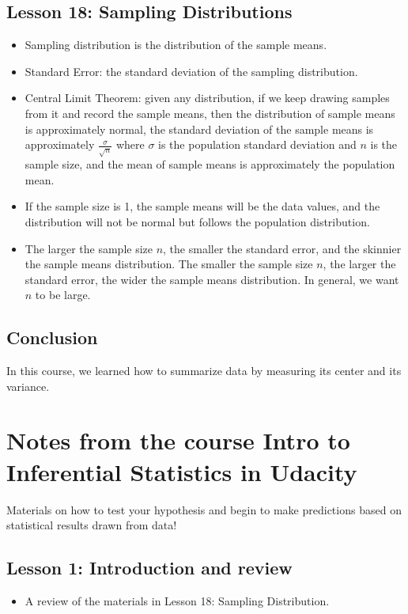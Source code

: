 \documentclass[twoside,12pt]{article}
\begin{document}
\subsection{Lesson 18: Sampling Distributions} 
\begin{itemize}
\item Sampling distribution is the distribution of the sample means. 
\item Standard Error: the standard deviation of the sampling distribution.
\item Central Limit Theorem: given any distribution, if we keep drawing samples from it and record the sample means, then the distribution of sample means is approximately normal, the standard deviation of the sample means is approximately $\frac{\sigma}{\sqrt{n}}$ where $\sigma$ is the population standard deviation and $n$ is the sample size, and the mean of sample means is approximately the population mean.
\item If the sample size is 1, the sample means will be the data values, and the distribution will not be normal but follows the population distribution.
\item The larger the sample size $n$, the smaller the standard error, and the skinnier the sample means distribution. The smaller the sample size $n$, the larger the standard error, the wider the sample means distribution. In general, we want $n$ to be large. 
\end{itemize}
\subsection{Conclusion}
In this course, we learned how to summarize data by measuring its center and its variance. 

\section{Notes from the course Intro to Inferential Statistics in Udacity}
Materials on how to test your hypothesis and begin to make predictions based on statistical results drawn from data!
\subsection{Lesson 1: Introduction and review}
\begin{itemize}
\item A review of the materials in Lesson 18: Sampling Distribution. 
\end{itemize}
\end{document}
